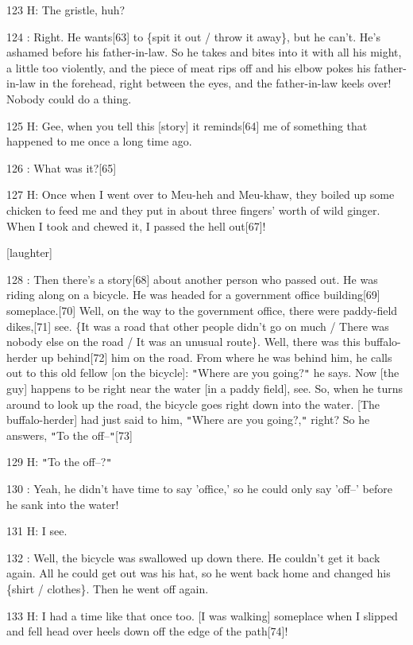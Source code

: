 123 H: The gristle, huh?

124  : Right. He wants[63] to \{spit it out / throw it away\}, but he can't. He's
ashamed before his father-in-law. So he takes and bites into it with all his might,
a little too violently, and the piece of meat rips off and his elbow pokes his
father-in-law in the forehead, right between the eyes, and the father-in-law keels
over! Nobody could do a thing.

125 H: Gee, when you tell this [story] it reminds[64] me of something that happened
to me once a long time ago.

126  : What was it?[65]

127 H: Once when I went over to Meu-heh and Meu-khaw, they boiled up some chicken
to feed me and they put in about three fingers' worth of wild ginger. When I took
and chewed it, I passed the hell out[67]!

[laughter]

128  : Then there's a story[68] about another person who passed out. He was riding
along on a bicycle. He was headed for a government office building[69] someplace.[70]
Well, on the way to the government office, there were paddy-field dikes,[71] see.
\{It was a road that other people didn't go on much / There was nobody else on
the road / It was an unusual route\}. Well, there was this buffalo-herder up behind[72]
him on the road. From where he was behind him, he calls out to this old fellow
[on the bicycle]: \texttt{"}Where are you going?\texttt{"} he says. Now [the guy]
happens to be right near the water [in a paddy field], see. So, when he turns around
to look up the road, the bicycle goes right down into the water. [The buffalo-herder]
had just said to him, \texttt{"}Where are you going?,\texttt{"} right? So he answers,
\texttt{"}To the off--\texttt{"}[73]

129 H: \texttt{"}To the off--?\texttt{"}

130  : Yeah, he didn't have time to say 'office,' so he could only say 'off--'
before he sank into the water!

131 H: I see.

132  : Well, the bicycle was swallowed up down there. He couldn't get it back again.
All he could get out was his hat, so he went back home and changed his \{shirt
/ clothes\}. Then he went off again.

133 H: I had a time like that once too. [I was walking] someplace when I slipped
and fell head over heels down off the edge of the path[74]!

